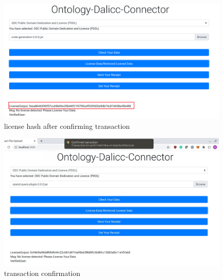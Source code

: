 \begin{center}
	\begin{figure}[htb!]
		
		\begin{minipage}{0.55\linewidth}
			\centering
			\includegraphics[width=1.95\textwidth]{images/chap03_license_hash.png}
		\end{minipage}
		\caption[license hash after confirming transaction]{license hash after confirming transaction}
		
	\end{figure}
	
\end{center}
\begin{center}
	\begin{figure}[htb!]
		
		\begin{minipage}{0.55\linewidth}
			\centering
			\includegraphics[width=1.95\textwidth]{images/chap03_confirm_tx.jpg}
		\end{minipage}
		\caption[transaction confirmation]{transaction confirmation}
		
	\end{figure}
	
\end{center}
